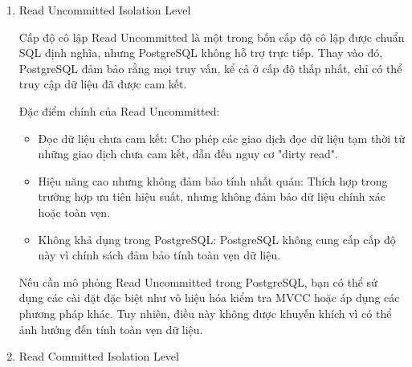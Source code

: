\begin{enumerate}
    \item Read Uncommitted Isolation Level
    
    \hspace{1cm}Cấp độ cô lập Read Uncommitted là một trong bốn cấp độ cô lập được chuẩn SQL định nghĩa, nhưng PostgreSQL không hỗ trợ trực tiếp. Thay vào đó, PostgreSQL đảm bảo rằng mọi truy vấn, kể cả ở cấp độ thấp nhất, chỉ có thể truy cập dữ liệu đã được cam kết.

    \hspace{1cm}Đặc điểm chính của Read Uncommitted:
    \begin{itemize}
        \item Đọc dữ liệu chưa cam kết: Cho phép các giao dịch đọc dữ liệu tạm thời từ những giao dịch chưa cam kết, dẫn đến nguy cơ "dirty read".
        \item Hiệu năng cao nhưng không đảm bảo tính nhất quán: Thích hợp trong trường hợp ưu tiên hiệu suất, nhưng không đảm bảo dữ liệu chính xác hoặc toàn vẹn.
        \item Không khả dụng trong PostgreSQL: PostgreSQL không cung cấp cấp độ này vì chính sách đảm bảo tính toàn vẹn dữ liệu.
    \end{itemize}

    \hspace{1cm}Nếu cần mô phỏng Read Uncommitted trong PostgreSQL, bạn có thể sử dụng các cài đặt đặc biệt như vô hiệu hóa kiểm tra MVCC hoặc áp dụng các phương pháp khác. Tuy nhiên, điều này không được khuyến khích vì có thể ảnh hưởng đến tính toàn vẹn dữ liệu.
    \item Read Committed Isolation Level


\end{enumerate}
